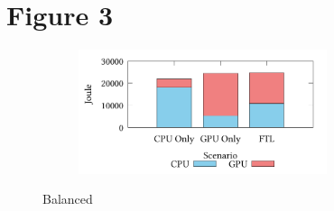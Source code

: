 \documentclass[8pt]{article}
\begin{document}


\clearpage

\section*{Figure 3}


\setcounter{figure}{2}
\renewcommand{\thefigure}{\arabic{figure}a}
\begin{figure}[!h]
\centering
\begin{subfigure}[b]{\mysize}
\centering
\includegraphics[width=0.8\textwidth]{figures_original/alternating.energy.pdf}
\renewcommand{\thesubfigure}{Original}
\caption{}
\end{subfigure}
\begin{subfigure}[b]{\mysize}
\centering
{}
\renewcommand{\thesubfigure}{Reproduced}
\caption{}
\end{subfigure}
\caption{Balanced}
\end{figure}
\end{document}
